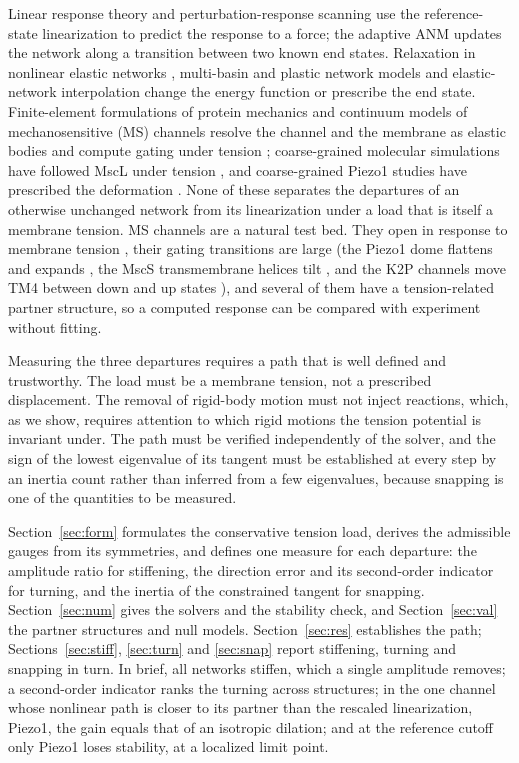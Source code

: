 \documentclass[preprint,12pt,a4paper]{elsarticle}
\begin{document}
Linear response theory \citep{ikeguchi2005} and perturbation-response scanning \citep{atilgan2009} use the reference-state linearization to predict the response to a force; the adaptive ANM \citep{yang2009aanm} updates the network along a transition between two known end states. Relaxation in nonlinear elastic networks \citep{togashi2007}, multi-basin and plastic network models \citep{miyashita2003,maragakis2005,chu2007} and elastic-network interpolation \citep{kim2002} change the energy function or prescribe the end state. Finite-element formulations of protein mechanics \citep{bathe2008} and continuum models of mechanosensitive (MS) channels resolve the channel and the membrane as elastic bodies and compute gating under tension \citep{wiggins2004,tang2006}; coarse-grained molecular simulations have followed MscL under tension \citep{yefimov2008,louhivuori2010}, and coarse-grained Piezo1 studies have prescribed the deformation \citep{zheng2017}. None of these separates the departures of an otherwise unchanged network from its linearization under a load that is itself a membrane tension. MS channels are a natural test bed. They open in response to membrane tension \citep{perozo2003,sukharev2001,chiang2004}, their gating transitions are large (the Piezo1 dome flattens and expands \citep{guo2017,saotome2018,lin2019,yang2022,mulhall2023,liu2025,haselwandter2018}, the MscS transmembrane helices tilt \citep{wang2008,reddy2019}, and the K2P channels move TM4 between down and up states \citep{brohawn2014,dong2015}), and several of them have a tension-related partner structure, so a computed response can be compared with experiment without fitting.

Measuring the three departures requires a path that is well defined and trustworthy. The load must be a membrane tension, not a prescribed displacement. The removal of rigid-body motion must not inject reactions, which, as we show, requires attention to which rigid motions the tension potential is invariant under. The path must be verified independently of the solver, and the sign of the lowest eigenvalue of its tangent must be established at every step by an inertia count rather than inferred from a few eigenvalues, because snapping is one of the quantities to be measured.

Section~\ref{sec:form} formulates the conservative tension load, derives the admissible gauges from its symmetries, and defines one measure for each departure: the amplitude ratio for stiffening, the direction error and its second-order indicator for turning, and the inertia of the constrained tangent for snapping. Section~\ref{sec:num} gives the solvers and the stability check, and Section~\ref{sec:val} the partner structures and null models. Section~\ref{sec:res} establishes the path; Sections~\ref{sec:stiff}, \ref{sec:turn} and \ref{sec:snap} report stiffening, turning and snapping in turn. In brief, all networks stiffen, which a single amplitude removes; a second-order indicator ranks the turning across structures; in the one channel whose nonlinear path is closer to its partner than the rescaled linearization, Piezo1, the gain equals that of an isotropic dilation; and at the reference cutoff only Piezo1 loses stability, at a localized limit point.
\end{document}
